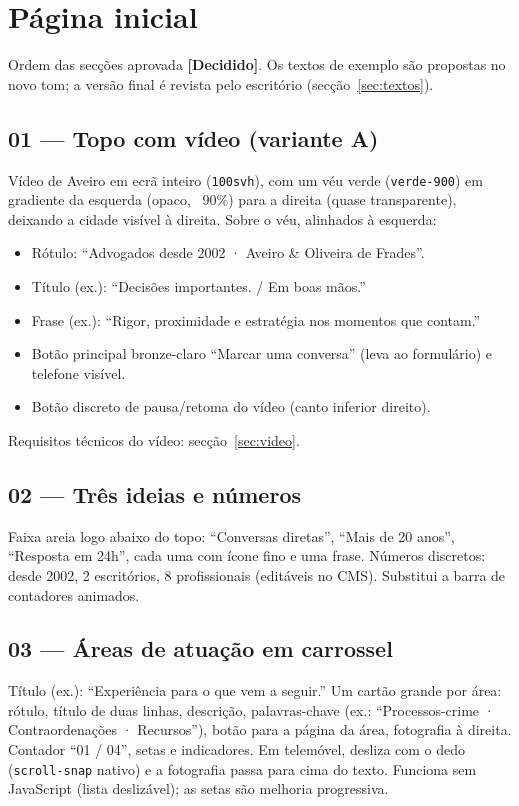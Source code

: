 \documentclass[11pt,a4paper]{article}
\newcommand{\decidido}{\textcolor{verde700}{\textbf{[Decidido]}}}
\begin{document}
\section{Página inicial}\label{sec:home}

Ordem das secções aprovada \decidido. Os textos de exemplo são propostas no novo tom; a versão final é revista pelo escritório (secção~\ref{sec:textos}).

\subsection*{01 --- Topo com vídeo (variante A)}
Vídeo de Aveiro em ecrã inteiro (\texttt{100svh}), com um véu verde (\texttt{verde-900}) em gradiente da esquerda (opaco, ~90\%) para a direita (quase transparente), deixando a cidade visível à direita. Sobre o véu, alinhados à esquerda:
\begin{itemize}
  \item Rótulo: ``Advogados desde 2002 · Aveiro \& Oliveira de Frades''.
  \item Título (ex.): ``Decisões importantes. / Em boas mãos.''
  \item Frase (ex.): ``Rigor, proximidade e estratégia nos momentos que contam.''
  \item Botão principal bronze-claro ``Marcar uma conversa'' (leva ao formulário) e telefone visível.
  \item Botão discreto de pausa/retoma do vídeo (canto inferior direito).
\end{itemize}
Requisitos técnicos do vídeo: secção~\ref{sec:video}.

\subsection*{02 --- Três ideias e números}
Faixa areia logo abaixo do topo: ``Conversas diretas'', ``Mais de 20 anos'', ``Resposta em 24h'', cada uma com ícone fino e uma frase. Números discretos: desde 2002, 2 escritórios, 8 profissionais (editáveis no CMS). Substitui a barra de contadores animados.

\subsection*{03 --- Áreas de atuação em carrossel}
Título (ex.): ``Experiência para o que vem a seguir.'' Um cartão grande por área: rótulo, título de duas linhas, descrição, palavras-chave (ex.: ``Processos-crime · Contraordenações · Recursos''), botão para a página da área, fotografia à direita. Contador ``01 / 04'', setas e indicadores. Em telemóvel, desliza com o dedo (\texttt{scroll-snap} nativo) e a fotografia passa para cima do texto. Funciona sem JavaScript (lista deslizável); as setas são melhoria progressiva.
\end{document}
